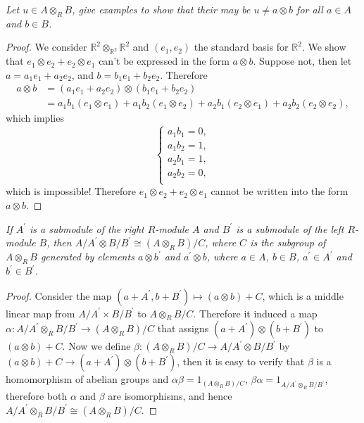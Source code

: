 \begin{problem}\em
Let $u\in A\otimes_RB$, give examples to show that their may be $u\ne a\otimes b$ for all $a\in A$ and $b\in B$.
\end{problem}
\begin{proof}
We consider $\mathbb{R}^2\otimes_{\mathbb{R}^2}\mathbb{R}^2$ and $(e_1,e_2)$ the standard basis for $\mathbb{R}^2$. We show that $e_1\otimes e_2+e_2\otimes e_1$ can't be expressed in the form $a\otimes b$. Suppose not, then let $a=a_1e_1+a_2e_2$, and $b=b_1e_1+b_2e_2$. Therefore 
$$
\begin{aligned}
a\otimes b&=\left( a_1e_1+a_2e_2 \right) \otimes \left( b_1e_1+b_2e_2 \right) 
\\
&=a_1b_1\left( e_1\otimes e_1 \right) +a_1b_2\left( e_1\otimes e_2 \right) +a_2b_1\left( e_2\otimes e_1 \right) +a_2b_2\left( e_2\otimes e_2 \right) ,
\end{aligned}
$$
which implies 
$$
\begin{cases}
	a_1b_1=0,\\
	a_1b_2=1,\\
	a_2b_1=1,\\
	a_2b_2=0,\\
\end{cases}
$$
which is impossible! Therefore $e_1\otimes e_2+e_2\otimes e_1$ cannot be written into the form $a\otimes b$.
\end{proof}
\begin{problem}\em
If $A^\prime$ is a submodule of the right $R$-module $A$ and $B^\prime$ is a submodule of the left $R$-module $B$, then $A/A^\prime\otimes B/B^\prime\cong(A\otimes_RB)/C$, where $C$ is the subgroup of $A\otimes_RB$ generated by elements $a\otimes b^\prime$ and $a^\prime\otimes b$, where $a\in A$, $b\in B$, $a^\prime\in A^\prime$ and $b^\prime\in B^\prime$.
\end{problem}
\begin{proof}
Consider the map $(a+A^\prime,b+B^\prime)\mapsto(a\otimes b)+C$, which is a middle linear map from $A/A^\prime\times B/B^\prime$ to $A\otimes_RB/C$. Therefore it induced a map $\alpha:A/A^\prime\otimes_R B/B^\prime\to(A\otimes_RB)/C$ that assigns $(a+A^\prime)\otimes(b+B^\prime)$ to $(a\otimes b)+C$. Now we define $\beta:(A\otimes_RB)/C\to A/A^\prime\otimes B/B^\prime$ by $(a\otimes b)+C\to(a+A^\prime)\otimes(b+B^\prime)$, then it is easy to verify that $\beta$ is a homomorphism of abelian groups and $\alpha\beta=1_{(A\otimes_RB)/C}$, $\beta\alpha=1_{A/A^\prime\otimes_RB/B^\prime}$, therefore both $\alpha$ and $\beta$ are isomorphisms, and hence $A/A^\prime\otimes_RB/B^\prime\cong(A\otimes_RB)/C$.
\end{proof}
